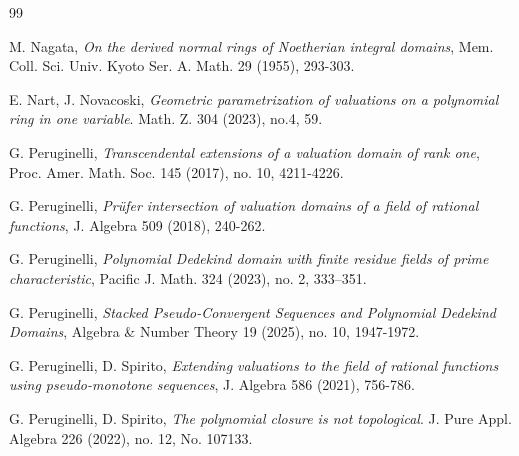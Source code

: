 \documentclass[10pt]{article}
\numberwithin{equation}{section}
\theoremstyle{definition}
\theoremstyle{definition}
\begin{document}
\begin{thebibliography}{99}


 M. Nagata, {\em On the derived normal rings of Noetherian integral domains},
Mem. Coll. Sci. Univ. Kyoto Ser. A. Math. 29 (1955), 293-303.


 E. Nart, J. Novacoski, \emph{Geometric parametrization of valuations on a polynomial ring in one variable}. Math. Z. 304 (2023), no.4, 59.



 G. Peruginelli, \emph{Transcendental extensions of a valuation domain of rank one}, Proc. Amer. Math. Soc. 145 (2017), no. 10, 4211-4226.

 G. Peruginelli, \emph{Pr\"ufer intersection of valuation domains of a field of rational functions}, J. Algebra 509 (2018), 240-262.


 G. Peruginelli, \emph{Polynomial Dedekind domain with finite residue fields of prime characteristic}, Pacific J. Math. 324 (2023), no. 2, 333–351.

 G. Peruginelli, \emph{Stacked Pseudo-Convergent Sequences and Polynomial Dedekind Domains}, 
Algebra \& Number Theory 19 (2025), no. 10, 1947-1972.




 G. Peruginelli, D. Spirito, \emph{Extending valuations to the field of rational functions using pseudo-monotone sequences}, J. Algebra 586 (2021), 756-786.

 G. Peruginelli, D. Spirito,  \emph{The polynomial closure is not topological}.
J. Pure Appl. Algebra 226 (2022), no. 12, No. 107133.



\end{thebibliography}
\end{document}
